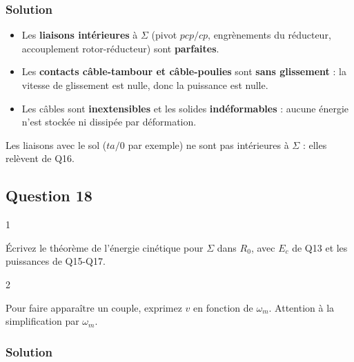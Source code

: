 \documentclass[11pt,a4paper]{article}
\providecommand{\tightlist}{\setlength{\itemsep}{0pt}\setlength{\parskip}{0pt}}
\newcommand{\equationajustee}[1]{%
  \sbox{\boiteequation}{$\displaystyle #1$}%
  \ifdim\wd\boiteequation>\linewidth
    \[\resizebox{\linewidth}{!}{\usebox{\boiteequation}}\]%
  \else
    \[#1\]%
  \fi}
\begin{document}
\hypertarget{solution-16}{%
\subsubsection{Solution}\label{solution-16}}

\begin{itemize}
\tightlist
\item
  Les \textbf{liaisons intérieures} à \(\Sigma\) (pivot \(pcp/cp\), engrènements du réducteur, accouplement rotor-réducteur) sont \textbf{parfaites}.
\item
  Les \textbf{contacts câble-tambour et câble-poulies} sont \textbf{sans glissement} : la vitesse de glissement est nulle, donc la puissance est nulle.
\item
  Les câbles sont \textbf{inextensibles} et les solides \textbf{indéformables} : aucune énergie n'est stockée ni dissipée par déformation.
\end{itemize}

\equationajustee{\boxed{P_{int,\Sigma}=0}}

\begin{piege}

Les liaisons avec le sol (\(ta/0\) par exemple) ne sont pas intérieures à \(\Sigma\) : elles relèvent de Q16.

\end{piege}

\hypertarget{question-18}{%
\subsection{Question 18}\label{question-18}}

\begin{indication}{1}

Écrivez le théorème de l'énergie cinétique pour \(\Sigma\) dans \(R_0\), avec \(E_c\) de Q13 et les puissances de Q15-Q17.

\end{indication}

\begin{indication}{2}

Pour faire apparaître un couple, exprimez \(v\) en fonction de \(\omega_m\). Attention à la simplification par \(\omega_m\).

\end{indication}

\hypertarget{solution-17}{%
\subsubsection{Solution}\label{solution-17}}
\end{document}
